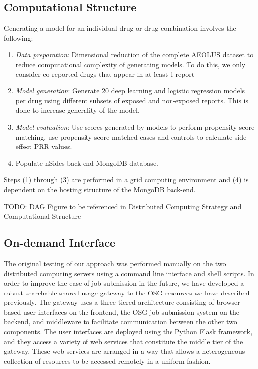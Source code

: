 \documentclass{ws-procs11x85}
\begin{document}
\subsection{Computational Structure}
Generating a model for an individual drug or drug combination involves the following:

\begin{enumerate}
\item {\it Data preparation}: Dimensional reduction of the complete AEOLUS dataset to reduce computational complexity of generating models. To do this, we only consider co-reported drugs that appear in at least 1 report
\item {\it Model generation}: Generate 20 deep learning and logistic regression models per drug using different subsets of exposed and non-exposed reports. This is done to increase generality of the model.
\item {\it Model evaluation}: Use scores generated by models to perform propensity score matching, use propensity score matched cases and controls to calculate side effect PRR values.
\item Populate nSides back-end MongoDB database.
\end{enumerate}

Steps (1) through (3) are performed in a grid computing environment and (4) is dependent on the hosting structure of the MongoDB back-end.

TODO: DAG Figure to be referenced in Distributed Computing Strategy and Computational Structure


\subsection{On-demand Interface}
The original testing of our approach was performed manually on the two
distributed computing servers using a command line interface and shell
scripts. In order to improve the ease of job submission in the future,
we have developed a robust searchable shared-usage gateway to the OSG
resources we have described previously. The gateway uses a
three-tiered architecture consisting of browser-based user interfaces
on the frontend, the OSG job submission system on the backend, and
middleware to facilitate communication between the other two
components. The user interfaces are deployed using the Python Flask
framework, and they access a variety of web services that constitute
the middle tier of the gateway. These web services are arranged in a
way that allows a heterogeneous collection of resources to be accessed
remotely in a uniform fashion.
\end{document}
